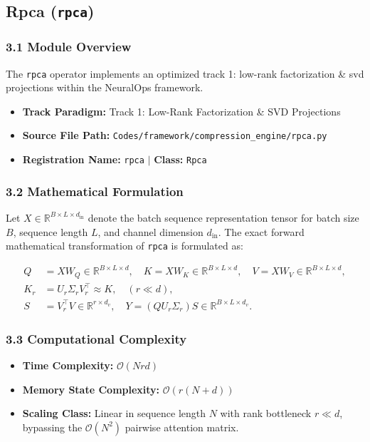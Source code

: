 \subsection{Rpca (\texttt{rpca})}
\label{sec:app_module_rpca}

\subsubsection*{3.1 Module Overview}
The \texttt{rpca} operator implements an optimized track 1: low-rank factorization \& svd projections within the NeuralOps framework.
\begin{itemize}
    \item \textbf{Track Paradigm:} Track 1: Low-Rank Factorization & SVD Projections
    \item \textbf{Source File Path:} \texttt{Codes/framework/compression\_engine/rpca.py}
    \item \textbf{Registration Name:} \texttt{rpca} $\mid$ \textbf{Class:} \texttt{Rpca}
\end{itemize}

\subsubsection*{3.2 Mathematical Formulation}
Let $X \in \mathbb{R}^{B \times L \times d_{\text{in}}}$ denote the batch sequence representation tensor for batch size $B$, sequence length $L$, and channel dimension $d_{\text{in}}$. The exact forward mathematical transformation of \texttt{rpca} is formulated as:

\begin{align}
Q &= X W_Q \in \mathbb{R}^{B \times L \times d}, \quad K = X W_K \in \mathbb{R}^{B \times L \times d}, \quad V = X W_V \in \mathbb{R}^{B \times L \times d}, \\
K_r &= U_r \Sigma_r V_r^\top \approx K, \quad (r \ll d), \\
S &= V_r^\top V \in \mathbb{R}^{r \times d_v}, \quad Y = (Q U_r \Sigma_r) S \in \mathbb{R}^{B \times L \times d_v}.
\end{align}


\subsubsection*{3.3 Computational Complexity}
\begin{itemize}
    \item \textbf{Time Complexity:} $\mathcal{O}(N r d)$
    \item \textbf{Memory State Complexity:} $\mathcal{O}(r(N + d))$
    \item \textbf{Scaling Class:} Linear in sequence length $N$ with rank bottleneck $r \ll d$, bypassing the $\mathcal{O}(N^2)$ pairwise attention matrix.
\end{itemize}

